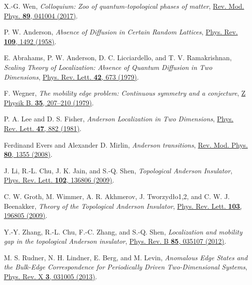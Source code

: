 \documentclass[aps,prb,amsmath,amssymb,twocolumn, superscriptaddress]{revtex4-2}
\begin{document}
\begin{thebibliography}{10}
X.-G. Wen, {\em Colloquium: Zoo of quantum-topological phases of matter}, \href{https://journals.aps.org/rmp/abstract/10.1103/RevModPhys.89.041004}{Rev. Mod. Phys. {\bf{89}}, 041004 (2017)}.

P. W. Anderson, {\em Absence of Diffusion in Certain Random Lattices}, \href{https://journals.aps.org/pr/abstract/10.1103/PhysRev.109.1492}{Phys. Rev. {\bfseries 109}, 1492 (1958)}.

E. Abrahams, P. W. Anderson, D. C. Licciardello, and T. V. Ramakrishnan, {\em Scaling Theory of Localization: Absence of Quantum Diffusion in Two Dimensions}, \href{https://journals.aps.org/prl/abstract/10.1103/PhysRevLett.42.673}{Phys. Rev. Lett. {\bfseries 42}, 673 (1979)}.

F. Wegner, {\em The mobility edge problem: Continuous symmetry and a conjecture}, \href{https://link.springer.com/article/10.1007/BF01319839}{Z Physik B. {\bfseries 35}, 207–210 (1979)}.

P. A. Lee and D. S. Fisher, {\em Anderson Localization in Two Dimensions}, \href{https://journals.aps.org/prl/abstract/10.1103/PhysRevLett.47.882}{Phys. Rev. Lett. {\bfseries 47}, 882 (1981)}.

Ferdinand Evers and Alexander D. Mirlin, {\em Anderson transitions}, \href{https://journals.aps.org/rmp/abstract/10.1103/RevModPhys.80.1355}{Rev. Mod. Phys. {\bf{80}}, 1355 (2008)}.

J. Li, R.-L. Chu, J. K. Jain, and S.-Q. Shen, {\em Topological Anderson Insulator}, \href{https://journals.aps.org/prl/abstract/10.1103/PhysRevLett.102.136806}{Phys. Rev. Lett. {\bfseries 102}, 136806 (2009)}.

C. W. Groth, M. Wimmer, A. R. Akhmerov, J. Tworzydło1,2, and C. W. J. Beenakker, {\em Theory of the Topological Anderson Insulator}, \href{https://journals.aps.org/prl/abstract/10.1103/PhysRevLett.103.196805}{Phys. Rev. Lett. {\bfseries 103}, 196805 (2009)}.

Y.-Y. Zhang, R.-L. Chu, F.-C. Zhang, and S.-Q. Shen, {\em Localization and mobility gap in the topological Anderson insulator}, \href{https://journals.aps.org/prb/abstract/10.1103/PhysRevB.85.035107}{Phys. Rev. B {\bfseries 85}, 035107 (2012)}.

M. S. Rudner, N. H. Lindner, E. Berg, and M. Levin, {\em Anomalous Edge States and the Bulk-Edge Correspondence for Periodically Driven Two-Dimensional Systems}, \href{https://journals.aps.org/prx/abstract/10.1103/PhysRevX.3.031005}{Phys. Rev. X {\bf 3}, 031005 (2013)}.


\end{thebibliography}
\end{document}
